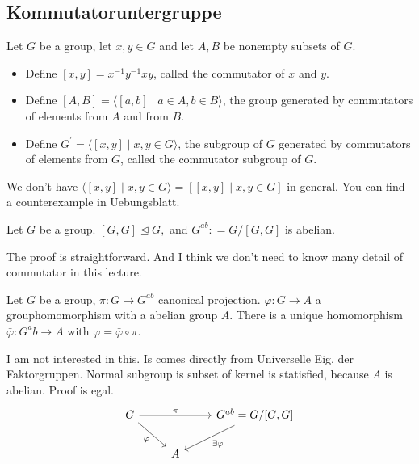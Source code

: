 
\subsection{Kommutatoruntergruppe}
\begin{definition}
    Let $G$ be a group, let $x, y \in G$ and let $A, B$ be nonempty subsets of $G$.
    \begin{itemize}
        \item Define $[x, y]=x^{-1} y^{-1} x y$, called the commutator of $x$ and $y$.
        \item Define $[A, B]=\langle[a, b] \mid a \in A, b \in B\rangle$, the group generated by commutators of elements from $A$ and from $B$.
        \item Define $G^{\prime}=\langle[x, y] \mid x, y \in G\rangle$, the subgroup of $G$ generated by commutators of elements from $G$, called the commutator subgroup of $G$.
    \end{itemize}
\end{definition}
\begin{remark}
    We don't have $\langle[x, y] \mid x, y \in G\rangle = [[x, y] \mid x, y \in G]$ in general. You can find a counterexample in Uebungsblatt.
\end{remark}
\begin{theorem}
    Let $G$ be a group. $[G,G]\unlhd G,$ and $G^{ab} : = G/[G,G]$ is abelian.
\end{theorem}
The proof is straightforward. And I think we don't need to know many detail of commutator in this lecture.
\begin{theorem}
    Let $G$ be a group, $\pi :G \to G^{ab}$ canonical projection. $\varphi:G \to A$ a grouphomomorphism with a abelian group $A$. There is a unique homomorphism \(\bar{\varphi}: G^ab \to A\) with \(\varphi = \bar{\varphi}\circ \pi\).
\end{theorem}
I am not interested in this. Is comes directly from Universelle Eig. der Faktorgruppen. Normal subgroup is subset of kernel is statisfied, because $A$ is abelian. Proof is egal.
$$%
\begin{tikzcd}
    G \arrow[rr, "\pi"] \arrow[rd, "\varphi"'] &   & {G^{ab} = G/[G,G]} \arrow[ld, "\exists \bar{\varphi}"] \\
                                               & A &                                                       
    \end{tikzcd}$$

